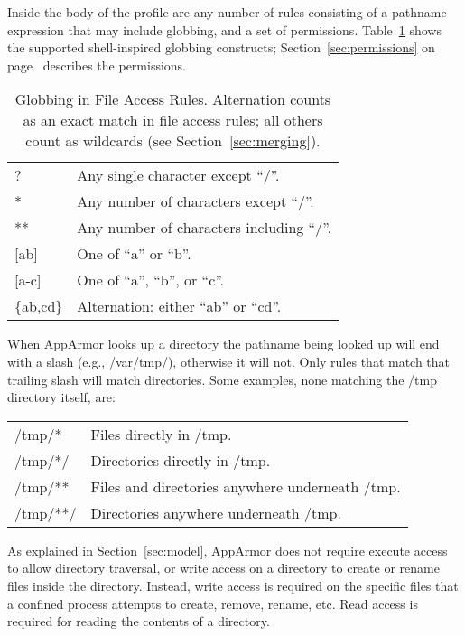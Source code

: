 \documentclass[a4paper]{article}
\begin{document}
Inside the body of the profile are any number of rules consisting of a
pathname expression that may include globbing, and a set of permissions.
Table~\ref{tab:globbing} shows the supported shell-inspired globbing
constructs; Section~\ref{sec:permissions} on
page~\pageref{sec:permissions} describes the permissions.

\begin{table}[tb]
\center
\begin{tabular}{|l|l|}
\hline
{?}		&	Any single character except ``/''.		\\
{*}		&	Any number of characters except ``/''.		\\
{**}		&	Any number of characters including ``/''.	\\
{[ab]}		&	One of ``a'' or ``b''.				\\
{[a-c]}		&	One of ``a'', ``b'', or ``c''.			\\
\{ab,cd\}	&	Alternation: either ``ab'' or ``cd''.		\\
\hline
\end{tabular}
\caption{Globbing in File Access Rules. Alternation counts as an exact
match in file access rules; all others count as wildcards (see
Section~\ref{sec:merging}).}
\label{tab:globbing}
\end{table}

When AppArmor looks up a directory the pathname being looked up will end
with a slash (e.g., /var/tmp/), otherwise it will not.  Only rules
that match that trailing slash will match directories.  Some examples,
none matching the /tmp directory itself, are:

\begin{tabbing}
\begin{tabular}{ll}
{/tmp/*}	& Files directly in /tmp.				\\
{/tmp/*/}	& Directories directly in /tmp.				\\
{/tmp/**}	& Files and directories anywhere underneath /tmp.	\\
{/tmp/**/}	& Directories anywhere underneath /tmp.			\\
\end{tabular}
\end{tabbing}

As explained in Section~\ref{sec:model}, AppArmor does not require
execute access to allow directory traversal, or write access on a
directory to create or rename files inside the directory. Instead, write
access is required on the specific files that a confined process
attempts to create, remove, rename, etc.  Read access is required for
reading the contents of a directory.
\end{document}
